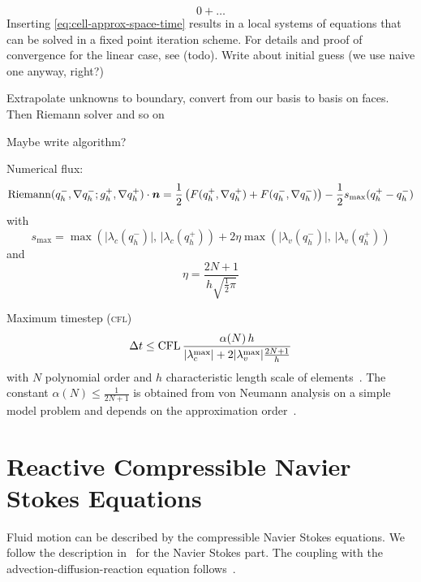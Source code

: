 \begin{equation}
  \label{eq:space-time-predictor}
0
  + \ldots
\end{equation}
Inserting \cref{eq:cell-approx-space-time} results in a local systems of equations that can be solved in a fixed point iteration scheme.
For details and proof of convergence for the linear case, see (todo).
Write about initial guess (we use naive one anyway, right?)

Extrapolate unknowns to boundary, convert from our basis to basis on faces.
Then Riemann solver
and so on

Maybe write algorithm?




Numerical flux:
\begin{equation}
  \label{eq:rusanov-flux}
  \operatorname{Riemann}(q_h^-, \nabla q_h^-; g_h^+, \nabla q_h^+) \cdot \bm{n} =
  \frac{1}{2} \left(
    F(q_h^+, \nabla q_h^+) +
    F(q_h^-, \nabla q_h^-)
  \right) -
  \frac{1}{2} s_\text{max} (q_h^+ - q_h^-)
\end{equation}
with
\begin{equation}
  \label{eq:parabolic-penalty}
  s_\text{max}  = \max \left(
\vert \lambda_c(q_h^-) \vert, \, \vert \lambda_c(q_h^+)
\right) +
2 \eta \max \left(
\vert \lambda_v(q_h^-) \vert, \, \vert \lambda_v(q_h^+)
\right)
\end{equation}
and
\begin{equation}
  \eta = \frac{2N+1}{h \sqrt{\frac{1}{2} \pi}}
\end{equation}

Maximum timestep (\textsc{cfl})
\begin{equation}
 \Delta t \leq  \text{CFL} \, \frac{\alpha(N) \, h}{\vert \lambda_c^{\text{max}} \vert + 2 \vert \lambda_v^{\text{max}} \vert \frac{2N+1}{h}}
\end{equation}
with $N$ polynomial order and $h$ characteristic length scale of elements~\cite{dumbser2010arbitrary,gassner2008discontinuous}.
The constant $\alpha(N) \leq \frac{1}{2N+1}$ is obtained from von Neumann analysis on a simple model problem and depends on the approximation order~\cite{dumbser2008unified}.


\section{Reactive Compressible Navier Stokes Equations}
Fluid motion can be described by the compressible Navier Stokes equations.
We follow the description in~\cite{dumbser2010arbitrary} for the Navier Stokes part.
The coupling with the advection-diffusion-reaction equation follows~\cite{hidalgo2011ader}.

